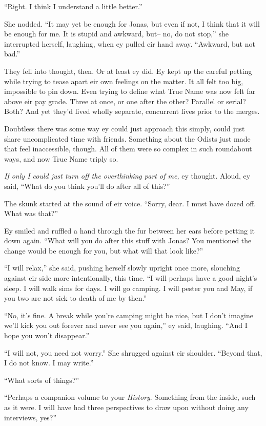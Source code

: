 ``Right. I think I understand a little better.''

She nodded. ``It may yet be enough for Jonas, but even if not, I think that it will be enough for me. It is stupid and awkward, but-- no, do not stop,'' she interrupted herself, laughing, when ey pulled eir hand away. ``Awkward, but not bad.''

They fell into thought, then. Or at least ey did. Ey kept up the careful petting while trying to tease apart eir own feelings on the matter. It all felt too big, impossible to pin down. Even trying to define what True Name was now felt far above eir pay grade. Three at once, or one after the other? Parallel or serial? Both? And yet they'd lived wholly separate, concurrent lives prior to the merges.

Doubtless there was some way ey could just approach this simply, could just share uncomplicated time with friends. Something about the Odists just made that feel inaccessible, though. All of them were so complex in such roundabout ways, and now True Name triply so.

\emph{If only I could just turn off the overthinking part of me,} ey thought. Aloud, ey said, ``What do you think you'll do after all of this?''

The skunk started at the sound of eir voice. ``Sorry, dear. I must have dozed off. What was that?''

Ey smiled and ruffled a hand through the fur between her ears before petting it down again. ``What will you do after this stuff with Jonas? You mentioned the change would be enough for you, but what will that look like?''

``I will relax,'' she said, pushing herself slowly upright once more, slouching against eir side more intentionally, this time. ``I will perhaps have a good night's sleep. I will walk sims for days. I will go camping. I will pester you and May, if you two are not sick to death of me by then.''

``No, it's fine. A break while you're camping might be nice, but I don't imagine we'll kick you out forever and never see you again,'' ey said, laughing. ``And I hope you won't disappear.''

``I will not, you need not worry.'' She shrugged against eir shoulder. ``Beyond that, I do not know. I may write.''

``What sorts of things?''

``Perhaps a companion volume to your \emph{History}. Something from the inside, such as it were. I will have had three perspectives to draw upon without doing any interviews, yes?''

